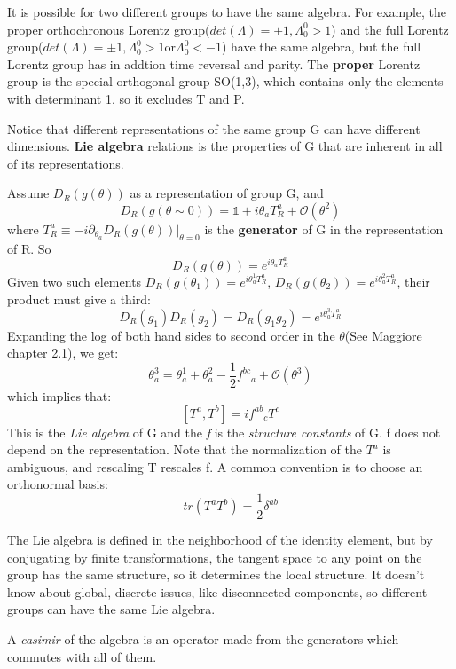 It is possible for two different groups to have the same algebra. For
example, the proper orthochronous Lorentz group($det(\Lambda)=+1,
\Lambda^0_0>1$) and the full Lorentz group($det(\Lambda)=\pm1,
\Lambda^0_0>1 \text{or} \Lambda^0_0<-1$)
have the same algebra, but the full Lorentz group has in addtion time
reversal and parity. The \textbf{proper} Lorentz group is the special
orthogonal group SO(1,3), which contains only the elements with determinant
1, so it excludes T and P.

Notice that different representations of the same group G can have different
dimensions. \textbf{Lie algebra} relations is the properties of G that are
inherent in all of its representations.
 
 Assume $D_R(g(\theta))$ as a representation of group G, and 
 \[
     D_R(g(\theta\sim0)) = \mathds{1} + i\theta_aT^a_R + \mathcal{O}(\theta^2)
     \]
 where $T^a_R \equiv -i\partial_{\theta_a}D_R(g(\theta))|_{\theta=0}$ 
 is the \textbf{generator} of G in the representation of R. So
 \[
     D_R(g(\theta)) = e^{i\theta_aT^a_R}
     \]
 Given two such elements $D_R(g(\theta_1)) = e^{i\theta^1_aT^a_R}$, 
 $D_R(g(\theta_2)) = e^{i\theta^2_aT^a_R}$, their product must give a third:
 \[
     D_R(g_1)D_R(g_2) = D_R(g_1g_2) = e^{i\theta^3_aT^a_R}
     \]
 Expanding the log of both hand sides to second order in the $\theta$(See
 Maggiore chapter 2.1), we get:
 \[
     \theta^3_a = \theta^1_a + \theta^2_a - \frac{1}{2}f^{bc}{}_a +\mathcal{O}(\theta^3)
     \]
 which implies that:
 \[
     [T^a, T^b] = if^{ab}{}_cT^c
     \]
 This is the \emph{Lie algebra} of G and the \emph{f} is the \emph{structure
 constants} of G. f does not depend on the representation. Note that the
 normalization of the $T^a$ is ambiguous, and rescaling T rescales f. A
 common convention is to choose an orthonormal basis:
 \[
     tr(T^aT^b) = \frac{1}{2}\delta^{ab}
     \]

 The Lie algebra is defined in the neighborhood of the identity element, but
 by conjugating by finite transformations, the tangent space to any point on
 the group has the same structure, so it determines the local structure. 
 It doesn't know about global, discrete issues, like disconnected components, 
 so different groups can have the same Lie algebra.

 A \emph{casimir} of the algebra is an operator made from the generators
 which commutes with all of them.

